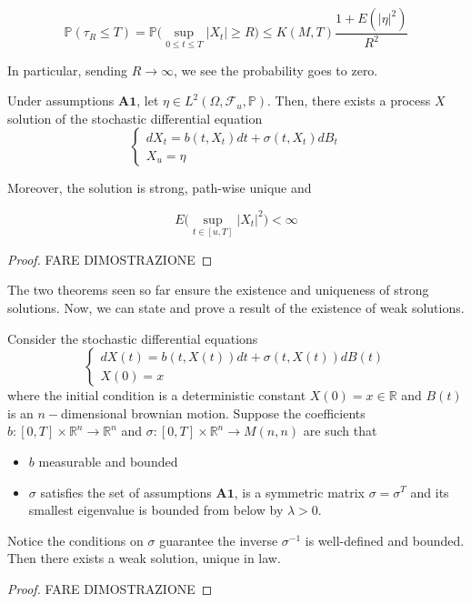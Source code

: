 \begin{equation}
    \mathbb{P}(\tau_R \leq T) = \mathbb{P}\Big(\sup_{0 \leq t \leq T} \vert X_t \vert \geq R \Big) \leq K(M,T) \frac{1+E(\vert \eta \vert^2)}{R^2}
\end{equation}

In particular, sending $R \to \infty$, we see the probability goes to zero. 

\begin{theorem}
Under assumptions $\textbf{A1}$, let $\eta \in L^2(\Omega,\mathcal{F}_u,\mathbb{P})$. Then, there exists a process $X$ solution of the stochastic differential equation
\begin{equation*}
    \begin{cases}
        dX_t = b(t,X_t) dt + \sigma(t,X_t) dB_t \\
        X_u = \eta
    \end{cases}
\end{equation*}

Moreover, the solution is strong, path-wise unique and

\begin{equation*}
    E\Big( \sup_{t \in [u,T]} \vert X_t \vert^2  \Big) < \infty
\end{equation*}

\end{theorem}
\begin{proof}
    FARE DIMOSTRAZIONE
\end{proof}

The two theorems seen so far ensure the existence and uniqueness of strong solutions. Now, we can state and prove a result of the existence of weak solutions. 

\begin{theorem}
    Consider the stochastic differential equations
    \begin{equation*}
    \begin{cases}
        dX(t) = b(t,X(t)) dt + \sigma(t,X(t)) dB(t) \\
        X(0) = x
    \end{cases}
    \end{equation*}
    where the initial condition is a deterministic constant $X(0) = x \in \mathbb{R}$ and $B(t)$ is an $n-$dimensional brownian motion. Suppose the coefficients $b:[0,T]\times \mathbb{R}^n \to \mathbb{R}^n$ and $\sigma : [0,T] \times \mathbb{R}^n \to M(n,n)$ are such that 
    \begin{itemize}
        \item $b$ measurable and bounded
        \item $\sigma$ satisfies the set of assumptions $\textbf{A1}$, is a symmetric matrix $\sigma = \sigma^T$ and its smallest eigenvalue is bounded from below by $\lambda > 0$.  
    \end{itemize}
    Notice the conditions on $\sigma$ guarantee the inverse $\sigma^{-1}$ is well-defined and bounded. Then there exists a weak solution, unique in law.  
\end{theorem}
\begin{proof}
    FARE DIMOSTRAZIONE
\end{proof}


